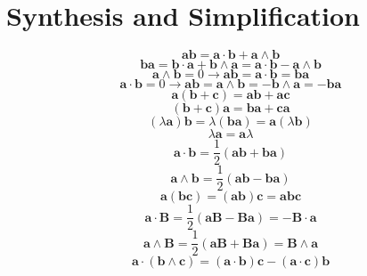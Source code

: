 \documentclass[11pt, a4paper, fleqn]{report}
\numberwithin{equation}{section}
\begin{document}
\section{Synthesis and Simplification}
\begin{equation}
    \mathbf{a}\mathbf{b}=\mathbf{a}\cdot\mathbf{b}+\mathbf{a}\wedge\mathbf{b}
\end{equation}
\begin{equation}
    \mathbf{b}\mathbf{a}=\mathbf{b}\cdot\mathbf{a}+\mathbf{b}\wedge\mathbf{a}=\mathbf{a}\cdot\mathbf{b}-\mathbf{a}\wedge\mathbf{b}
\end{equation}
\begin{equation}
    \mathbf{a}\wedge\mathbf{b}=0\rightarrow
    \mathbf{a}\mathbf{b}=\mathbf{a}\cdot\mathbf{b}=\mathbf{b}\mathbf{a}
\end{equation}
\begin{equation}
    \mathbf{a}\cdot\mathbf{b}=0\rightarrow
\mathbf{a}\mathbf{b}=\mathbf{a}\wedge\mathbf{b}=-\mathbf{b}\wedge\mathbf{a}=-\mathbf{b}\mathbf{a}
\end{equation}
\begin{equation}
    \mathbf{a}(\mathbf{b}+\mathbf{c})=\mathbf{a}\mathbf{b}+\mathbf{a}\mathbf{c}
\end{equation}
\begin{equation}
    (\mathbf{b}+\mathbf{c})\mathbf{a}=\mathbf{b}\mathbf{a}+\mathbf{c}\mathbf{a}
\end{equation}
\begin{equation}
    (\lambda\mathbf{a})\mathbf{b}=\lambda(\mathbf{b}\mathbf{a})=\mathbf{a}(\lambda\mathbf{b})
\end{equation}
\begin{equation}
    \lambda\mathbf{a}=\mathbf{a}\lambda
\end{equation}
\begin{equation}
    \mathbf{a}\cdot\mathbf{b}=\frac{1}{2}(\mathbf{a}\mathbf{b}+\mathbf{b}\mathbf{a})
\end{equation}
\begin{equation}
    \mathbf{a}\wedge\mathbf{b}=\frac{1}{2}(\mathbf{a}\mathbf{b}-\mathbf{b}\mathbf{a})
\end{equation}
\begin{equation}
    \mathbf{a}(\mathbf{b}\mathbf{c})=(\mathbf{a}\mathbf{b})\mathbf{c}=\mathbf{a}\mathbf{b}\mathbf{c}
\end{equation}
\begin{equation}
    \mathbf{a}\cdot\mathbf{B}=\frac{1}{2}(\mathbf{a}\mathbf{B}-\mathbf{B}\mathbf{a})=-\mathbf{B}\cdot\mathbf{a}
\end{equation}
\begin{equation}
    \mathbf{a}\wedge\mathbf{B}=\frac{1}{2}(\mathbf{a}\mathbf{B}+\mathbf{B}\mathbf{a})=\mathbf{B}\wedge\mathbf{a}
\end{equation}
\begin{equation}
    \mathbf{a}\cdot(\mathbf{b}\wedge\mathbf{c})=(\mathbf{a}\cdot\mathbf{b})\mathbf{c}-(\mathbf{a}\cdot\mathbf{c})\mathbf{b}
\end{equation}
\end{document}
